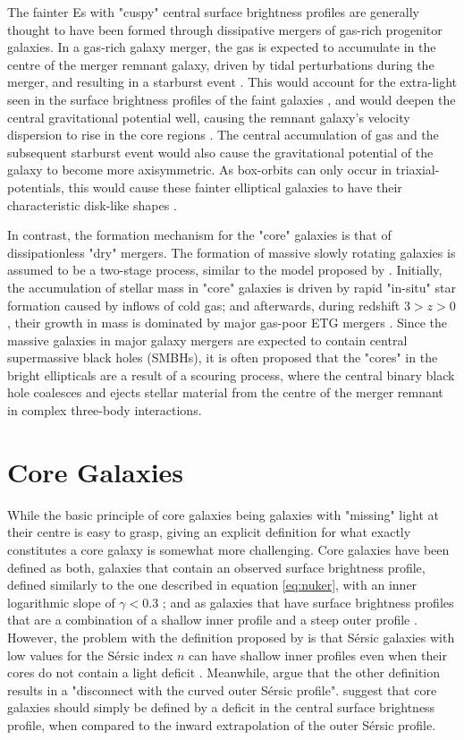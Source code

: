 \documentclass[english, oneside]{HYgradu}
\begin{document}
The fainter Es with "cuspy" central surface brightness profiles are generally thought to have been formed through dissipative mergers of gas-rich progenitor galaxies. In a gas-rich galaxy merger, the gas is expected to accumulate in the centre of the merger remnant galaxy, driven by tidal perturbations during the merger, and resulting in a starburst event \citep{Barnes1991}. This would account for the extra-light seen in the surface brightness profiles of the faint galaxies \citep{Hopkins2008}, and would deepen the central gravitational potential well,  causing the remnant galaxy's velocity dispersion to rise in the core regions \citep{Barnes1996}. The central accumulation of gas and the subsequent starburst event would also cause the gravitational potential of the galaxy to become more axisymmetric. As box-orbits can only occur in triaxial-potentials, this would cause these fainter elliptical galaxies to have their characteristic disk-like shapes \citep{Naab2006}.

In contrast, the formation mechanism for the "core" galaxies is that of dissipationless "dry" mergers. The formation of massive slowly rotating galaxies is assumed to be a two-stage process, similar to the model proposed by \cite{Oser2010}. Initially, the accumulation of stellar mass in "core" galaxies is driven by rapid "in-situ" star formation caused by inflows of cold gas; and afterwards, during redshift $3 > z > 0$, their growth in mass is dominated by major gas-poor ETG mergers \citep{Naab2009}. Since the massive galaxies in major galaxy mergers are expected to contain central supermassive black holes (SMBHs), it is often proposed that the "cores" in the bright ellipticals are a result of a scouring process, where the central binary black hole coalesces and ejects stellar material from the centre of the merger remnant in complex three-body interactions.

\section{Core Galaxies}

While the basic principle of core galaxies being galaxies with "missing" light at their centre is easy to grasp, giving an explicit definition for what exactly constitutes a core galaxy is somewhat more challenging. Core galaxies have been defined as both, galaxies that contain an observed surface brightness profile, defined similarly to the one described in equation \ref{eq:nuker}, with an inner logarithmic slope of $\gamma < 0.3$ \citep{Lauer1995, Lauer2007}; and as galaxies that have surface brightness profiles that are a combination of a shallow inner profile and a steep outer profile \citep{Kormendy1999}. However, the problem with the definition proposed by \cite{Lauer1995} is that Sérsic galaxies with low values for the Sérsic index $n$ can have shallow inner profiles even when their cores do not contain a light deficit \citep{Graham2003}. Meanwhile, \cite{Dullo2012} argue that the other definition results in a "disconnect with the curved outer Sérsic profile". \cite{Graham2003} suggest that core galaxies should simply be defined by a deficit in the central surface brightness profile, when compared to the inward extrapolation of the outer Sérsic profile.
\end{document}
